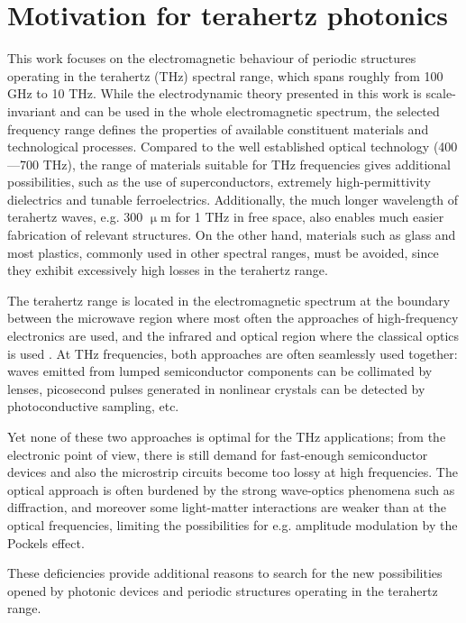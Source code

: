 \section{Motivation for terahertz photonics} %
This work focuses on the electromagnetic behaviour of periodic structures operating in the terahertz (THz) spectral range, which spans roughly from 100 GHz to 10 THz. While the electrodynamic theory presented in this work is scale-invariant and can be used in the whole electromagnetic spectrum, the selected frequency range defines the properties of available constituent materials and technological processes. Compared to the well established optical technology (400---700 THz), the range of materials suitable for THz frequencies gives additional possibilities, such as the use of superconductors, extremely high-permittivity dielectrics and tunable ferroelectrics. Additionally, the much longer wavelength of terahertz waves, e.g. 300 $\upmu$m for 1 THz in free space, also enables much easier fabrication of relevant structures. On the other hand, materials such as glass and most plastics, commonly used in other spectral ranges, must be avoided, since they exhibit excessively high losses in the terahertz range.

The terahertz range is located in the electromagnetic spectrum at the boundary between the microwave region where most often the approaches of high-frequency electronics are used, and the infrared and optical region where the classical optics is used \cite{ozyuzer2007emission}. At THz frequencies, both approaches are often seamlessly used together: waves emitted from lumped semiconductor components can be collimated by lenses, picosecond pulses generated in nonlinear crystals can be detected by photoconductive sampling, etc.  

Yet none of these two approaches is optimal for the THz applications; from the electronic point of view, there is still demand for fast-enough semiconductor devices and also the microstrip circuits become too lossy at high frequencies. The optical approach is often burdened by the strong wave-optics phenomena such as diffraction, and moreover some light-matter interactions are weaker than at the optical frequencies, limiting the possibilities for e.g. amplitude modulation by the Pockels effect. 

These deficiencies provide additional reasons to search for the new possibilities opened by photonic devices and periodic structures operating in the terahertz range.  

